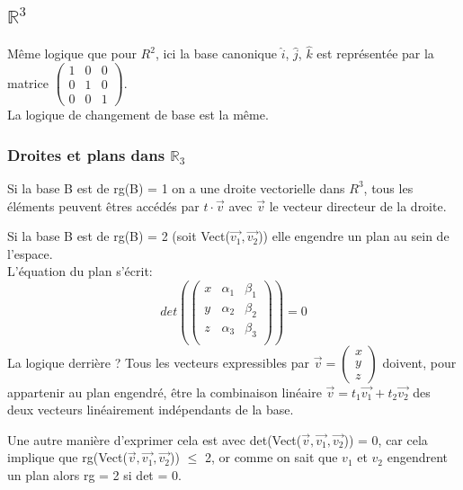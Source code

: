 \documentclass[10pt,a4paper]{book}
\newcommand{\R}{\mathbb{R}}
\begin{document}
\subsection{\texorpdfstring{$\R^3$}{R3}}

Même logique que pour $R^2$, ici la base canonique $\hat{i}$, $\hat{j}$, $\hat{k}$ est représentée par la matrice $\begin{pmatrix} 1 & 0 & 0 \\ 0 & 1 & 0 \\ 0 & 0 & 1\end{pmatrix}$.\\
La logique de changement de base est la même.

\subsubsection{Droites et plans dans $\R_3$}

Si la base B est de rg(B) = 1 on a une droite vectorielle dans $R^3$, tous les éléments peuvent êtres accédés par $t\cdot \vec{v}$ avec $\vec{v}$ le vecteur directeur de la droite.\par
Si la base B est de rg(B) = 2 (soit Vect($\vec{v_1}, \vec{v_2}$)) elle engendre un plan au sein de l'espace. \\
L'équation du plan s'écrit:
\[det\left(\begin{pmatrix}
x & \alpha_1 & \beta_1 \\
y & \alpha_2 & \beta_2 \\
z & \alpha_3 & \beta_3 \\
\end{pmatrix}\right) = 0\]
La logique derrière ? Tous les vecteurs expressibles par $\vec{v} = \begin{pmatrix} x \\ y \\ z \end{pmatrix}$ doivent, pour appartenir au plan engendré, être la combinaison linéaire $\vec{v} = t_1\vec{v_1} + t_2\vec{v_2}$ des deux vecteurs linéairement indépendants de la base. \par
Une autre manière d'exprimer cela est avec det(Vect($\vec{v}, \vec{v_1}, \vec{v_2}$)) = 0, car cela implique que rg(Vect($\vec{v}, \vec{v_1}, \vec{v_2}$)) $\leq$ 2, or comme on sait que $v_1$ et $v_2$ engendrent un plan alors rg = 2 si det = 0. %
\end{document}
